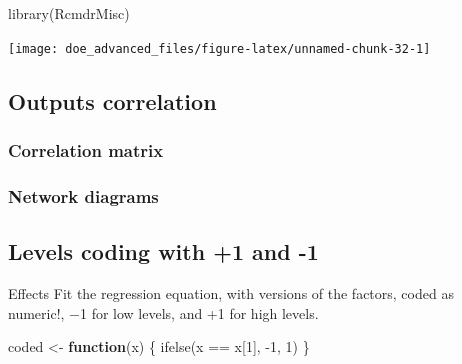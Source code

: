 \documentclass[
]{book}
\newenvironment{Shaded}{\begin{snugshade}}{\end{snugshade}}
\newcommand{\AttributeTok}[1]{\textcolor[rgb]{0.77,0.63,0.00}{#1}}
\newcommand{\CommentTok}[1]{\textcolor[rgb]{0.56,0.35,0.01}{\textit{#1}}}
\newcommand{\ControlFlowTok}[1]{\textcolor[rgb]{0.13,0.29,0.53}{\textbf{#1}}}
\newcommand{\DecValTok}[1]{\textcolor[rgb]{0.00,0.00,0.81}{#1}}
\newcommand{\FunctionTok}[1]{\textcolor[rgb]{0.00,0.00,0.00}{#1}}
\newcommand{\NormalTok}[1]{#1}
\newcommand{\OtherTok}[1]{\textcolor[rgb]{0.56,0.35,0.01}{#1}}
\newcommand{\SpecialCharTok}[1]{\textcolor[rgb]{0.00,0.00,0.00}{#1}}
\begin{document}
\begin{Shaded}
\begin{Highlighting}[]
\FunctionTok{library}\NormalTok{(RcmdrMisc)}
\end{Highlighting}
\end{Shaded}

\begin{Shaded}
\end{Shaded}

\texttt{[image: doe\_advanced\_files/figure-latex/unnamed-chunk-32-1]}

\hypertarget{outputs-correlation}{%
\subsection{Outputs correlation}\label{outputs-correlation}}

\hypertarget{correlation-matrix}{%
\subsubsection{Correlation matrix}\label{correlation-matrix}}

\hypertarget{network-diagrams}{%
\subsubsection{Network diagrams}\label{network-diagrams}}

\hypertarget{levels-coding-with-1-and--1}{%
\subsection{Levels coding with +1 and -1}\label{levels-coding-with-1-and--1}}

Effects
Fit the regression equation, with versions of the factors, coded as numeric!, −1 for low levels, and +1 for high levels.

\begin{Shaded}
\begin{Highlighting}[]
\NormalTok{coded }\OtherTok{\textless{}{-}} \ControlFlowTok{function}\NormalTok{(x) \{}
  \FunctionTok{ifelse}\NormalTok{(x }\SpecialCharTok{==}\NormalTok{ x[}\DecValTok{1}\NormalTok{], }\SpecialCharTok{{-}}\DecValTok{1}\NormalTok{, }\DecValTok{1}\NormalTok{)}
\NormalTok{\}}
\end{Highlighting}
\end{Shaded}
\end{document}
